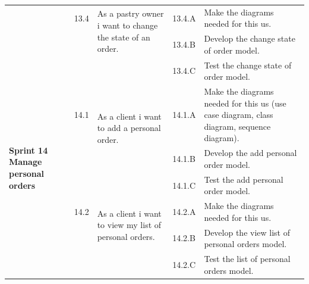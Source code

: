 \documentclass[12pt,a4paper]{report}
\begin{document}
\begin{table}[H]
\begin{center}
\begin{tabular}{|  p{3cm}|  p{1cm}| p{4cm}|  p{1cm}| p{6cm}|}
			&                       
			13.4  &  
			\multirow{2}{4cm}{As a pastry owner i want to change the state of an order.}
			
			&				                      
			13.4.A &                        
			Make the diagrams needed for this \ac{us}.
			\\ 
			\cline{4-5}    
			&                   
			&                                 
			&                        
			13.4.B &                        
			Develop the change state of order model.
			\\ 
			\cline{4-5}    
			&                   
			&                                 
			&                        
			13.4.C &                        
			Test the change state of order model.
			\\
			\hline
			\multirow{5}{3cm}{\textbf{Sprint 14} \textbf{Manage personal orders} }
			&                       
			14.1  &  
			\multirow{2}{4cm}{As a client i want to add a personal order.}
			
			&				                      
			14.1.A &                        
			Make the diagrams needed for this \ac{us} (use case diagram, class diagram, sequence diagram).
			\\ 
			\cline{4-5}    
			&                   
			&                                 
			&                        
			14.1.B &                        
			Develop the add personal order model.
			\\ 
			\cline{4-5}    
			&                   
			&                                 
			&                        
			14.1.C &                        
			Test the  add personal order model.
			\\
			\cline{2-5}  
			
			&                       
			14.2  &  
			\multirow{2}{4cm}{As a client i want to view my list of personal orders.}
			
			&				                      
			14.2.A &                        
			Make the diagrams needed for this \ac{us}.
			\\ 
			\cline{4-5}    
			&                   
			&                                 
			&                        
			14.2.B &                        
			Develop the view list of personal orders model.
			\\ 
			\cline{4-5}    
			&                   
			&                                 
			&                        
			14.2.C &                        
			Test the list of personal orders model.
			
			\\
			\hline
		\end{tabular}
		
	\end{center}
	
\end{table}
\end{document}
